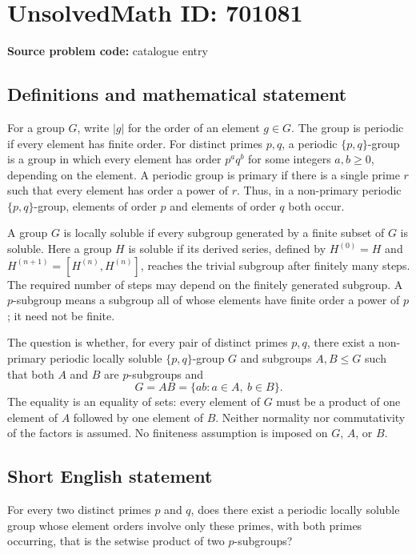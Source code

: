 \documentclass[11pt]{article}
\begin{document}
\section*{UnsolvedMath ID: 701081}
\textbf{Source problem code:} catalogue entry
\subsection{Definitions and mathematical statement}
For a group \(G\), write \(|g|\) for the order of an element \(g\in G\). The group is periodic if every element has finite order. For distinct primes \(p,q\), a periodic \(\{p,q\}\)-group is a group in which every element has order \(p^a q^b\) for some integers \(a,b\geq 0\), depending on the element. A periodic group is primary if there is a single prime \(r\) such that every element has order a power of \(r\). Thus, in a non-primary periodic \(\{p,q\}\)-group, elements of order \(p\) and elements of order \(q\) both occur.

A group \(G\) is locally soluble if every subgroup generated by a finite subset of \(G\) is soluble. Here a group \(H\) is soluble if its derived series, defined by \(H^{(0)}=H\) and \(H^{(n+1)}=[H^{(n)},H^{(n)}]\), reaches the trivial subgroup after finitely many steps. The required number of steps may depend on the finitely generated subgroup. A \(p\)-subgroup means a subgroup all of whose elements have finite order a power of \(p\); it need not be finite.

The question is whether, for every pair of distinct primes \(p,q\), there exist a non-primary periodic locally soluble \(\{p,q\}\)-group \(G\) and subgroups \(A,B\leq G\) such that both \(A\) and \(B\) are \(p\)-subgroups and
\[
G=AB=\{ab:a\in A,\ b\in B\}.
\]
The equality is an equality of sets: every element of \(G\) must be a product of one element of \(A\) followed by one element of \(B\). Neither normality nor commutativity of the factors is assumed. No finiteness assumption is imposed on \(G\), \(A\), or \(B\).
\subsection{Short English statement}
For every two distinct primes \(p\) and \(q\), does there exist a periodic locally soluble group whose element orders involve only these primes, with both primes occurring, that is the setwise product of two \(p\)-subgroups?
\end{document}

